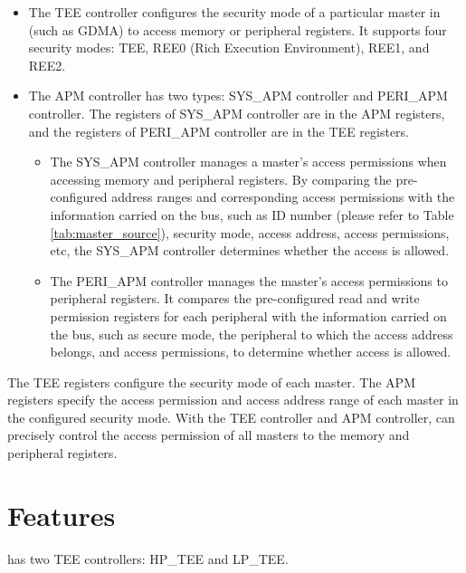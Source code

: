 \documentclass[main\_\_EN.tex]{subfiles}
\begin{document}
\begin{itemize}
\item The TEE controller configures the security mode of a particular master in \chipname{} (such as GDMA) to access memory or peripheral registers. It supports four security modes: TEE, REE0 (Rich Execution Environment), REE1, and REE2.

\item The APM controller has two types: SYS\_APM controller and PERI\_APM controller. The registers of SYS\_APM controller are in the APM registers, and the registers of PERI\_APM controller are in the TEE registers.

    \begin{itemize}
    \item The SYS\_APM controller manages a master's access permissions when accessing memory and peripheral registers. By comparing the pre-configured address ranges and corresponding access permissions with the information carried on the bus, such as ID number (please refer to Table \ref{tab:master_source}), security mode, access address, access permissions, etc, the SYS\_APM controller determines whether the access is allowed.

    \item The PERI\_APM controller manages the master's access permissions to peripheral registers. It compares the pre-configured read and write permission registers for each peripheral with the information carried on the bus, such as secure mode, the peripheral to which the access address belongs, and access permissions, to determine whether access is allowed.
\end{itemize}
\end{itemize}

The TEE registers configure the security mode of each master. The APM registers specify the access permission and access address range of each master in the configured security mode. With the TEE controller and APM controller, \chipname{} can precisely control the access permission of all masters to the memory and peripheral registers.

\section{Features}\label{sec:permctrl-features}

\chipname{} has two TEE controllers: HP\_TEE and LP\_TEE.
\end{document}
